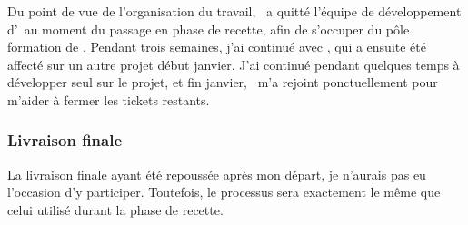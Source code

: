 Du point de vue de l'organisation du travail, \ahamon\ a quitté l'équipe de développement d'\aey\ au moment du passage en phase de recette, afin de s'occuper du pôle formation de \asl. Pendant trois semaines, j'ai continué avec \aweistroff, qui a ensuite été affecté sur un autre projet début janvier. J'ai continué pendant quelques temps à développer seul sur le projet, et fin janvier, \abachelet\ m'a rejoint ponctuellement pour m'aider à fermer les tickets restants.


\subsubsection{Livraison finale}

La livraison finale ayant été repoussée après mon départ, je n'aurais pas eu l'occasion d'y participer. Toutefois, le processus sera exactement le même que celui utilisé durant la phase de recette.
